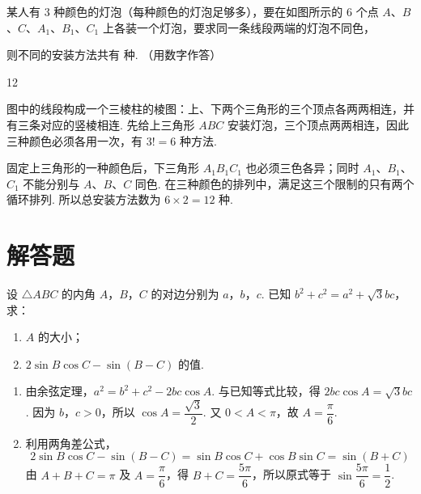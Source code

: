 \begin{problem}
某人有 \(3\) 种颜色的灯泡（每种颜色的灯泡足够多），要在如图所示的 \(6\) 个点
\(A\)、\(B\)、\(C\)、\(A_1\)、\(B_1\)、\(C_1\) 上各装一个灯泡，要求同一条线段两端的灯泡不同色，


则不同的安装方法共有\fillinblank{} 种. （用数字作答）
\end{problem}

\begin{answer}
12
\end{answer}

\begin{solution}
图中的线段构成一个三棱柱的棱图：上、下两个三角形的三个顶点各两两相连，并有三条对应的竖棱相连. 先给上三角形 \(ABC\) 安装灯泡，三个顶点两两相连，因此三种颜色必须各用一次，有 \(3!=6\) 种方法.

固定上三角形的一种颜色后，下三角形 \(A_{1}B_{1}C_{1}\) 也必须三色各异；同时 \(A_{1}\)、\(B_{1}\)、\(C_{1}\) 不能分别与 \(A\)、\(B\)、\(C\) 同色. 在三种颜色的排列中，满足这三个限制的只有两个循环排列. 所以总安装方法数为 \(6\times2=12\) 种.
\end{solution}

\section{解答题}

\begin{problem}
设 \(\triangle ABC\) 的内角 \(A\)，\(B\)，\(C\) 的对边分别为 \(a\)，\(b\)，\(c\). 已知 \(b^2 + c^2 = a^2 + \sqrt{3}bc\)，求：
\begin{enumerate}
\item \(A\) 的大小；
\item \(2\sin B\cos C - \sin (B - C)\) 的值.
\end{enumerate}
\end{problem}

\begin{solution}
\begin{enumerate}
\item 由余弦定理，\(a^{2}=b^{2}+c^{2}-2bc\cos A\). 与已知等式比较，得 \(2bc\cos A=\sqrt{3}bc\). 因为 \(b\)，\(c>0\)，所以 \(\cos A=\dfrac{\sqrt{3}}{2}\). 又 \(0<A<\pi\)，故 \(A=\dfrac{\pi}{6}\).
\item 利用两角差公式，
\[
2\sin B\cos C-\sin\left(B-C\right)=\sin B\cos C+\cos B\sin C=\sin\left(B+C\right)
\]
由 \(A+B+C=\pi\) 及 \(A=\dfrac{\pi}{6}\)，得 \(B+C=\dfrac{5\pi}{6}\)，所以原式等于 \(\sin\dfrac{5\pi}{6}=\dfrac12\).
\end{enumerate}
\end{solution}

